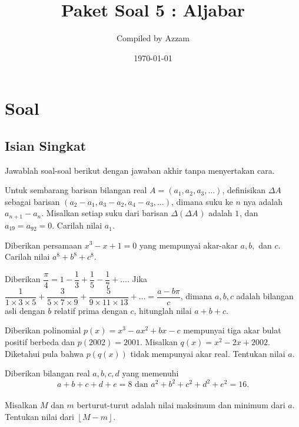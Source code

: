 \documentclass[11pt]{scrartcl}
\begin{document}
	\title{Paket Soal 5 : Aljabar} %
	\date{\today}
	\author{Compiled by Azzam}
	\maketitle
	\newpage
	
	\section{Soal}
\subsection{Isian Singkat}
Jawablah soal-soal berikut dengan jawaban akhir tanpa menyertakan cara.

	\begin{soalbaru}
		Untuk sembarang barisan bilangan real $A=(a_1,a_2,a_3,\ldots)$, definisikan $\Delta A^{}_{}$ sebagai barisan $(a_2-a_1,a_3-a_2,a_4-a_3,\ldots)$, dimana suku ke $n$ nya adalah  $a_{n+1}-a_n^{}$. Misalkan setiap suku dari barisan  $\Delta(\Delta A^{}_{})$ adalah $1^{}_{}$, dan $a_{19}=a_{92}^{}=0$. Carilah nilai $a_1^{}$.
	\end{soalbaru}
	
	\begin{soalbaru}
		Diberikan persamaan $x^3-x+1=0$ yang mempunyai akar-akar $a,b,$ dan $c$. Carilah nilai $a^8+b^8+c^8$.
	\end{soalbaru}
	
	\begin{soalbaru}
			Diberikan $\dfrac{\pi}{4} = 1 - \dfrac{1}{3}+\dfrac{1}{5}-\dfrac{1}{7}+\dots$. Jika  $\dfrac{1}{1 \times 3 \times 5}+\dfrac{3}{5 \times 7 \times 9}+\dfrac{5}{9 \times 11 \times 13}+\dots = \dfrac{a-b\pi}{c}$, dimana $a,b,c$ adalah bilangan asli dengan $b$ relatif prima dengan $c$, hitunglah nilai $a+b+c$.
		\end{soalbaru}
	
	\begin{soalbaru}
		Diberikan polinomial $p(x)=x^3-ax^2+bx-c$ mempunyai tiga akar bulat positif berbeda dan $p(2002)=2001$. Misalkan $q(x)=x^2-2x+2002$. Diketahui pula bahwa $p(q(x))$ tidak mempunyai akar real. Tentukan nilai $a$.
	\end{soalbaru}
	
	\begin{soalbaru}
		Diberikan bilangan real $a,b,c,d$ yang memenuhi\\[-20pt] $$a+b+c+d+e=8 \text{ dan }a^2+b^2+c^2+d^2+e^2=16.$$\\[-25pt] Misalkan $M$ dan $m$ berturut-turut adalah nilai maksimum dan minimum dari $a$. Tentukan nilai dari $\left \lfloor M-m \right \rfloor$.  %
	\end{soalbaru}
	
\end{document}

